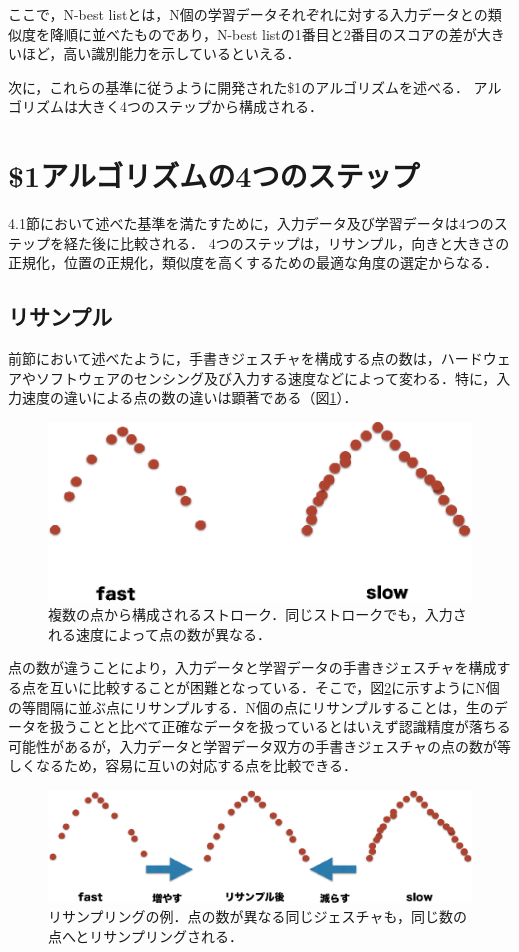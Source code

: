ここで，N-best listとは，N個の学習データそれぞれに対する入力データとの類似度を降順に並べたものであり，N-best listの1番目と2番目のスコアの差が大きいほど，高い識別能力を示しているといえる．

次に，これらの基準に従うように開発された\$1のアルゴリズムを述べる．
アルゴリズムは大きく4つのステップから構成される．


\section{\$1アルゴリズムの4つのステップ}
4.1節において述べた基準を満たすために，入力データ及び学習データは4つのステップを経た後に比較される．
4つのステップは，リサンプル，向きと大きさの正規化，位置の正規化，類似度を高くするための最適な角度の選定からなる．

\subsection{リサンプル}
前節において述べたように，手書きジェスチャを構成する点の数は，ハードウェアやソフトウェアのセンシング及び入力する速度などによって変わる．特に，入力速度の違いによる点の数の違いは顕著である（図\ref{fig:strokes}）．

\begin{figure} [!h]
\centering
\includegraphics [width=0.6\columnwidth]{img/strokes.eps}
\caption{複数の点から構成されるストローク．同じストロークでも，入力される速度によって点の数が異なる．}
\label{fig:strokes}
\end{figure}

点の数が違うことにより，入力データと学習データの手書きジェスチャを構成する点を互いに比較することが困難となっている．そこで，図\ref{fig:resample}に示すようにN個の等間隔に並ぶ点にリサンプルする．N個の点にリサンプルすることは，生のデータを扱うことと比べて正確なデータを扱っているとはいえず認識精度が落ちる可能性があるが，入力データと学習データ双方の手書きジェスチャの点の数が等しくなるため，容易に互いの対応する点を比較できる．

\begin{figure} [!h]
\centering
\includegraphics [width=0.8\columnwidth]{img/resample.eps}
\caption{リサンプリングの例．点の数が異なる同じジェスチャも，同じ数の点へとリサンプリングされる．}
\label{fig:resample}
\end{figure}

